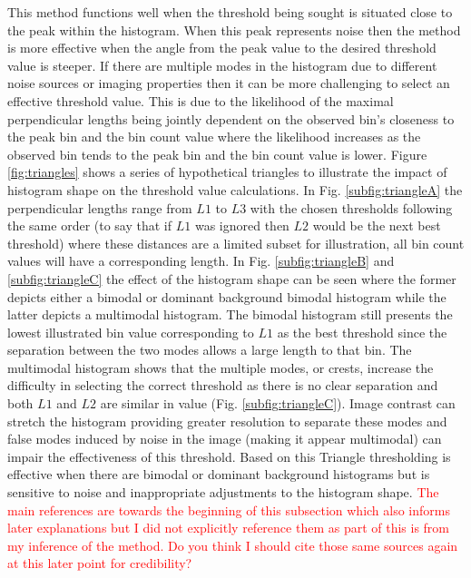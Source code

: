 \par This method functions well when the threshold being sought is situated close to the peak within the histogram. When this peak represents noise then the method is more effective when the angle from the peak value to the desired threshold value is steeper. If there are multiple modes in the histogram due to different noise sources or imaging properties then it can be more challenging to select an effective threshold value. This is due to the likelihood of the maximal perpendicular lengths being jointly dependent on the observed bin's closeness to the peak bin and the bin count value where the likelihood increases as the observed bin tends to the peak bin and the bin count value is lower. Figure \ref{fig:triangles} shows a series of hypothetical triangles to illustrate the impact of histogram shape on the threshold value calculations. In Fig. \ref{subfig:triangleA} the perpendicular lengths range from $L1$ to $L3$ with the chosen thresholds following the same order (to say that if $L1$ was ignored then $L2$ would be the next best threshold) where these distances are a limited subset for illustration, all bin count values will have a corresponding length. In Fig. \ref{subfig:triangleB} and \ref{subfig:triangleC} the effect of the histogram shape can be seen where the former depicts either a bimodal or dominant background bimodal histogram while the latter depicts a multimodal histogram. The bimodal histogram still presents the lowest illustrated bin value corresponding to $L1$ as the best threshold since the separation between the two modes allows a large length to that bin. The multimodal histogram shows that the multiple modes, or crests, increase the difficulty in selecting the correct threshold as there is no clear separation and both $L1$ and $L2$ are similar in value (Fig. \ref{subfig:triangleC}). Image contrast can stretch the histogram providing greater resolution to separate these modes and false modes induced by noise in the image (making it appear multimodal) can impair the effectiveness of this threshold. Based on this Triangle thresholding is effective when there are bimodal or dominant background histograms but is sensitive to noise and inappropriate adjustments to the histogram shape. \textcolor{red}{The main references are towards the beginning of this subsection which also informs later explanations but I did not explicitly reference them as part of this is from my inference of the method. Do you think I should cite those same sources again at this later point for credibility?}

